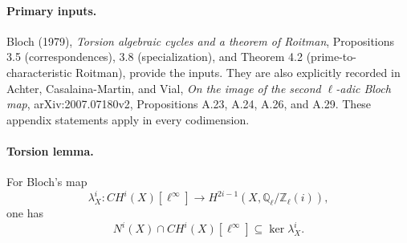 \paragraph{Primary inputs.}
Bloch (1979), \emph{Torsion algebraic cycles and a theorem of Roitman},
Propositions 3.5 (correspondences), 3.8 (specialization), and
Theorem 4.2 (prime-to-characteristic Roitman), provide the inputs.
They are also explicitly recorded in Achter, Casalaina-Martin,
and Vial, \emph{On the image of the second $\ell$-adic Bloch map},
arXiv:2007.07180v2, Propositions A.23, A.24, A.26, and A.29.
These appendix statements apply in every codimension.

\paragraph{Torsion lemma.}
For Bloch's map
\[
 \lambda_X^i:CH^i(X)[\ell^\infty]\longrightarrow
                    H^{2i-1}(X,\mathbb Q_\ell/\mathbb Z_\ell(i)),
\]
one has
\[
 N^i(X)\cap CH^i(X)[\ell^\infty]\subseteq\ker\lambda_X^i.          \tag{AQ.5}
\]
